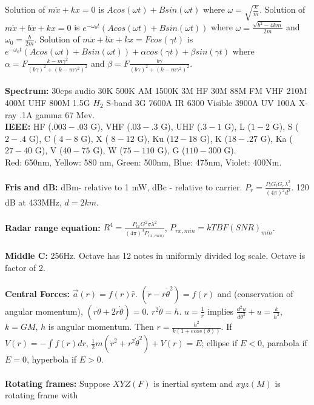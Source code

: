 Solution of $m\ddot{x} +kx=0$ 
is $Acos(\omega t)+Bsin(\omega t)$ where $\omega= {\sqrt {\frac k m}}$.
Solution of $m\ddot{x} +b \dot{x} +kx=0$
is $e^{- \omega_0 t} (Acos(\omega t)+Bsin(\omega t))$ where 
$\omega= {\frac {\sqrt {b^2-4 k m}} {2m}}$ and
$\omega_0= {\frac b {2m}}$.
Solution of $m\ddot{x} +b \dot{x} +kx= F cos(\gamma t)$ is
$e^{- \omega_0 t} (Acos(\omega t)+Bsin(\omega t)) +
\alpha cos(\gamma t)+ \beta sin (\gamma t)$ where 
$\alpha= F{\frac {k- m \gamma^2} {(b \gamma)^2 + (k - m \gamma^2)^2}}$ and
$\beta= F{\frac {b \gamma} {(b \gamma)^2 + (k - m \gamma^2)^2}}$.
\\
\\
{\bf Spectrum:}  
30cps audio 30K 500K AM 1500K 3M HF 30M 88M FM VHF 210M 400M UHF 800M 1.5G 
$H_{2}$ S-band 3G 7600A IR 6300 Visible 3900A UV 100A X-ray .1A gamma
67 Mev. 
\\
{\bf IEEE:} HF ($.003 - .03$ G), VHF ($.03 - .3$ G), UHF ($.3 - 1$ G), L ($1 - 2$ G),
S ($2 - .4$ G), C ( $4 - 8$ G), X ( $8 - 12$ G),
Ku ($12 - 18$ G), K ($18 - .27$ G), Ka ($27  - 40$ G),
V ($40 - 75$ G), W ($75 - 110$ G), G ($110 - 300$ G).
\\
Red: 650nm, Yellow: 580 nm, Green: 500nm, Blue: 475nm, Violet: 400Nm.  
\\
\\
{\bf Fris and dB:} dBm- relative to 1 mW, dBc - relative to carrier.
$P_r = {\frac { P_t G_t G_r \lambda^2} { (4 \pi)^2 d^2}}$. 120 dB at 433MHz,
$d= 2km$.
\\
\\
{\bf Radar range equation:} $R^4= {\frac {P_{tx} G^2 \sigma \lambda^2}
{(4 \pi)^3 P_{rx, min)}} }$, $P_{rx, min} = k T B F (SNR)_{min}$.
\\
\\
{\bf Middle C:}  256Hz. Octave has 12 notes in uniformly divided log scale.
Octave is factor of 2.
\\
\\
{\bf Central Forces:} $\vec{a}(r)=f(r) \hat{r}$.  
$(\ddot{r}-r{\dot{\theta}}^2)=f(r)$ and (conservation of angular momentum),
$(r \ddot{\theta} + 2 \dot{r} \dot{\theta})=0$. $r^2 \dot{\theta}=h$.
$u= {\frac {1} {r}}$ implies ${\frac {d^2 u}{d \theta^2}} + u = {\frac k {h^2}}$,
$k= GM$, $h$ is angular momentum.  
Then $r= {\frac {h^2}{k(1+e cos( \theta ))}}$.  If 
$V(r)= - \int f(r) dr$, ${\frac 1 2} m({\dot {r}}^2 +r^2 {\dot{\theta}}^2)+V(r)= E$;
ellipse if $E<0$, parabola if $E=0$, hyperbola if $E>0$.
\\
\\
{\bf Rotating frames:}
Suppose $XYZ (F)$ is inertial system and $xyz (M)$ is rotating frame with
